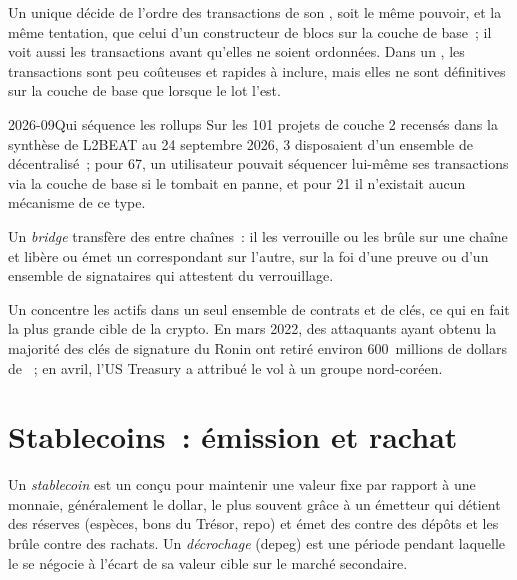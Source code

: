 Un  unique décide de l'ordre des transactions de son , soit le même pouvoir, et la même
tentation, que celui d'un constructeur de blocs sur la couche de base~; il voit aussi les transactions avant qu'elles ne soient ordonnées. Dans un
, les transactions sont peu coûteuses et rapides à inclure, mais elles ne sont définitives sur la couche de base que lorsque le lot l'est.

\begin{dated}{2026-09}{Qui séquence les rollups}\label{dat:m3:blockchains-for-traders:l2beat}
Sur les 101 projets de couche 2 recensés dans la synthèse de L2BEAT au 24 septembre 2026, 3 disposaient d'un ensemble de  décentralisé~; pour 67, un utilisateur
pouvait séquencer lui-même ses transactions via la couche de base si le  tombait en panne, et pour 21 il n'existait aucun mécanisme de ce type.
\end{dated}

\begin{definition}[Bridge]\label{def:m3:blockchains-for-traders:bridge}
Un \emph{bridge} transfère des  entre chaînes~: il les verrouille ou les brûle sur une chaîne et libère
ou émet un  correspondant sur l'autre, sur la foi d'une preuve ou d'un ensemble de signataires qui attestent
du verrouillage.
\end{definition}

Un  concentre les actifs dans un seul ensemble de contrats et de clés, ce qui en fait la plus grande cible de la crypto.
En mars 2022, des attaquants ayant obtenu la majorité des clés de signature du  Ronin ont retiré environ
600~millions de dollars de ~; en avril, l'US Treasury a attribué le vol à un groupe nord-coréen.

\section{Stablecoins~: émission et rachat}

\begin{definition}\label{def:m3:blockchains-for-traders:stable}
Un \emph{stablecoin} est un  conçu pour maintenir une valeur fixe par rapport à une monnaie, généralement
le dollar, le plus souvent grâce à un émetteur qui détient des réserves (espèces, bons du Trésor, repo) et émet des  contre des dépôts
et les brûle contre des rachats. Un \emph{décrochage} (depeg) est une période pendant laquelle le  se négocie
à l'écart de sa valeur cible sur le marché secondaire.
\end{definition}

